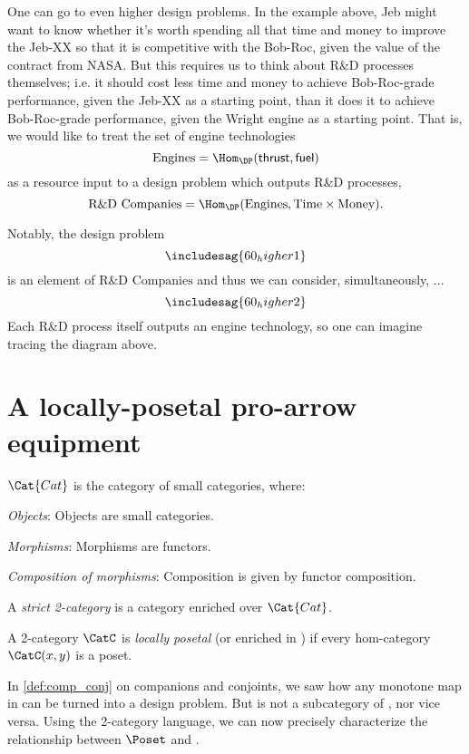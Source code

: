 One can go to even higher design problems. In the example above, Jeb might want to know whether it's worth spending all that time and money to improve the Jeb-XX so that it is competitive with the Bob-Roc, given the value of the contract from NASA. But this requires us to think about R\&D processes themselves; i.e. it should cost less time and money to achieve Bob-Roc-grade performance, given the Jeb-XX as a starting point, than it does it to achieve Bob-Roc-grade performance, given the Wright engine as a starting point. That is, we would like to treat the set of engine technologies
\[\text{Engines} = \Hom_\DP(\mathsf{thrust}, \mathsf{fuel})\]
as a resource input to a design problem which outputs R\&D processes,
\[\text{R\&D Companies} = \Hom_\DP(\text{Engines}, \text{Time} \times \text{Money}).\]

Notably, the design problem
\[
\includesag{60_higher1}
\]
is an element of $\text{R\&D Companies}$ and thus we can consider, simultaneously, ...
\[
\includesag{60_higher2}
\]
Each R\&D process itself outputs an engine technology, so one can imagine tracing the diagram above.

\section{A locally-posetal pro-arrow equipment}
\begin{definition}
$\Cat{Cat}$ is the category of small categories, where:
\begin{compactenum}
    \item \emph{Objects}: Objects are small categories.
    \item \emph{Morphisms}: Morphisms are functors.
    \item \emph{Composition of morphisms}: Composition is given by functor composition.
\end{compactenum}
\end{definition}

\begin{definition}[2-category]
A \emph{strict 2-category} is a category enriched over $\Cat{Cat}$.
\end{definition}

\begin{definition}
\label{def:locallyposetalcat}
A 2-category $\CatC$ is \emph{locally posetal} (or enriched in \Pos) if every hom-category $\CatC(x,y)$ is a poset.
\end{definition}
In \cref{def:comp_conj} on companions and conjoints, we saw how any monotone map in \Pos can be turned into a design problem. But \DP is not a subcategory of \Pos, nor vice versa. Using the 2-category language, we can now precisely characterize the relationship between $\Poset$ and \DP. %

